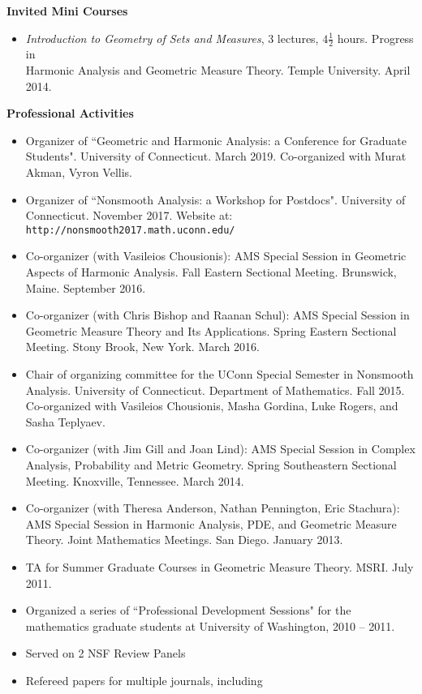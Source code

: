\documentclass[12pt]{amsart}
\newcommand{\ssection}[1]{\noindent\textbf{#1}\vspace{.2cm}}
\newcommand{\esection}{\vspace{.3cm}}
\begin{document}
\ssection{Invited Mini Courses}


\begin{itemize}
\item \emph{Introduction to Geometry of Sets and Measures}, 3 lectures, $4\frac12$ hours. Progress in\\ Harmonic Analysis and Geometric Measure Theory. Temple University. April 2014.
\end{itemize}
\esection

\ssection{Professional Activities}

\begin{itemize}
\item Organizer of ``Geometric and Harmonic Analysis: a Conference for Graduate Students". University of Connecticut. March 2019. Co-organized with Murat Akman, Vyron Vellis.
\item Organizer of ``Nonsmooth Analysis: a Workshop for Postdocs". University of Connecticut. November 2017. Website at:
\texttt{http://nonsmooth2017.math.uconn.edu/}
\item Co-organizer (with Vasileios Chousionis): AMS Special Session in Geometric Aspects of Harmonic Analysis. Fall Eastern Sectional Meeting. Brunswick, Maine. September 2016.
\item Co-organizer (with Chris Bishop and Raanan Schul): AMS Special Session in Geometric Measure Theory and Its Applications. Spring Eastern Sectional Meeting. Stony Brook, New York. March 2016.
\item Chair of organizing committee for the UConn Special Semester in Nonsmooth Analysis. University of Connecticut. Department of Mathematics. Fall 2015. Co-organized with Vasileios Chousionis, Masha Gordina, Luke Rogers, and Sasha Teplyaev.
\item Co-organizer (with Jim Gill and Joan Lind): AMS Special Session in Complex Analysis, Probability and Metric Geometry. Spring Southeastern Sectional Meeting. Knoxville, Tennessee. March 2014.
\item Co-organizer (with Theresa Anderson, Nathan Pennington, Eric Stachura): AMS Special Session in Harmonic Analysis, PDE, and Geometric Measure Theory. Joint Mathematics Meetings. San Diego. January 2013.
\item TA for Summer Graduate Courses in Geometric Measure Theory. MSRI. July 2011.
\item Organized a series of ``Professional Development Sessions" for the  mathematics graduate students at University of Washington, 2010 -- 2011.
\item Served on 2 NSF Review Panels
\item Refereed papers for multiple journals, including


\end{itemize}
\end{document}
